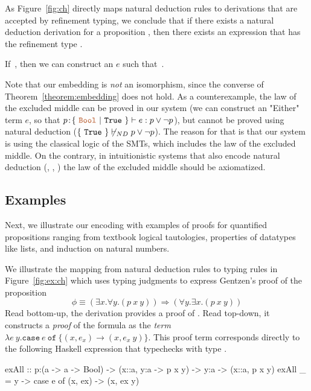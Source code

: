 %
As Figure~\ref{fig:ch} directly maps
natural deduction rules to derivations
that are accepted by refinement typing,
we conclude that if there exists a
natural deduction derivation for a
proposition \formula, then there
exists an expression that has the refinement type \formula.
\begin{theorem}\label{theorem:embedding}
If\ \gentzenValid{\env}{\formula},
then we can construct an $e$ such that\ .
\end{theorem}

Note that our embedding is \textit{not} an isomorphism, 
since the converse of Theorem~\ref{theorem:embedding} does not hold. 
%
As a counterexample, the law of the excluded middle
can be proved in our system
(\ie we can construct an "Either" term $e$, so that 
$\ch{\bind{p}{\proofterm{\typbool\ | \ \etrue}}}{e}{p\lor\neg p}$), 
but cannot be proved using natural deduction
(\ie ${\{\ \texttt{True}\ \}}\not \vdash_{ND}{p\lor\neg p}$).
%
The reason for that is that our system is using the classical logic
of the SMTs, which includes the law of the excluded middle.
On the contrary, in intuitionistic systems that also encode natural deduction
(\eg \coq, \idris, \nuPRL)
the law of the excluded middle should be axiomatized.

%
\subsection{Examples}\label{sec:expressiveness:examples}
%
Next, we illustrate our encoding
with examples of proofs for
quantified propositions
ranging from
%
textbook logical tautologies,
%
properties of datatypes like lists,
%
and induction on natural numbers.
%

%
We illustrate the mapping from natural deduction rules to typing rules
in Figure~\ref{fig:ex:ch} which uses typing judgments to express
Gentzen's proof of the proposition
%
$$
\phi \equiv (\exists x. \forall y. (p\ x\ y)) \Rightarrow (\forall y. \exists x. (p\ x\ y))
$$
%
Read bottom-up, the derivation provides a proof of \formula.
Read top-down, it constructs a \emph{proof} of the formula
as the \emph{term}
$\lambda e\ y. \texttt{case}\ e\ \texttt{of}\ \{
    (x,e_x) \rightarrow (x, e_x\ y)\}$.
%
This proof term corresponds directly to the following Haskell expression
that typechecks with type \formula.
\begin{mcode}
    exAll :: p:(a -> a -> Bool) -> (x::a, y:a -> {p x y}) -> y:a -> (x::a, {p x y})
    exAll _ = \e y -> case e of {(x, ex) -> (x, ex y)}
\end{mcode}
%


